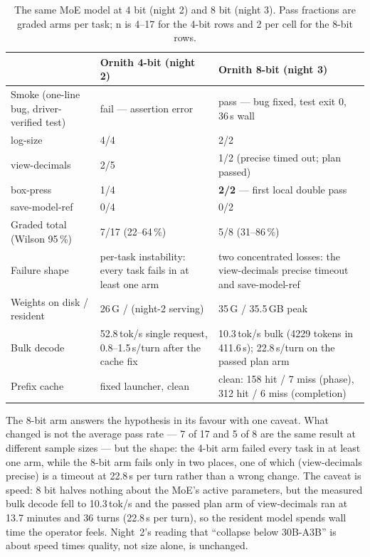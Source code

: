 \begin{table}[htbp]
\centering
\small
\caption{The same MoE model at 4 bit (night 2) and 8 bit (night 3). Pass fractions are graded arms per task;
n is 4--17 for the 4-bit rows and 2 per cell for the 8-bit rows.}\label{tab:quant}
\begin{tabular}{P{3.4cm}P{4.4cm}P{5.6cm}}
\toprule
& Ornith 4-bit (night 2) & Ornith 8-bit (night 3) \\
\midrule
Smoke (one-line bug, driver-verified test) & fail --- assertion error & pass --- bug fixed, test exit 0, 36\,s wall \\
log-size & 4/4 & 2/2 \\
view-decimals & 2/5 & 1/2 (precise timed out; plan passed) \\
box-press & 1/4 & \textbf{2/2} --- first local double pass \\
save-model-ref & 0/4 & 0/2 \\
Graded total (Wilson 95\,\%) & 7/17 (22--64\,\%) & 5/8 (31--86\,\%) \\
Failure shape & per-task instability: every task fails in at least one arm & two concentrated losses: the view-decimals precise timeout and save-model-ref \\
Weights on disk / resident & 26\,G / (night-2 serving) & 35\,G / 35.5\,GB peak \\
Bulk decode & 52.8\,tok/s single request, 0.8--1.5\,s/turn after the cache fix & 10.3\,tok/s bulk (4229 tokens in 411.6\,s); 22.8\,s/turn on the passed plan arm \\
Prefix cache & fixed launcher, clean & clean: 158 hit / 7 miss (phase), 312 hit / 6 miss (completion) \\
\bottomrule
\end{tabular}
\end{table}

The 8-bit arm answers the hypothesis in its favour with one caveat. What changed is not the average pass rate ---
7 of 17 and 5 of 8 are the same result at different sample sizes --- but the shape: the 4-bit arm failed every
task in at least one arm, while the 8-bit arm fails only in two places, one of which (view-decimals precise) is a
timeout at 22.8\,s per turn rather than a wrong change. The caveat is speed: 8 bit halves nothing about the MoE's
active parameters, but the measured bulk decode fell to 10.3\,tok/s and the passed plan arm of view-decimals ran
at 13.7 minutes and 36 turns (22.8\,s per turn), so the resident model spends wall time the operator feels.
Night~2's reading that ``collapse below 30B-A3B'' is about speed times quality, not size alone, is unchanged.

